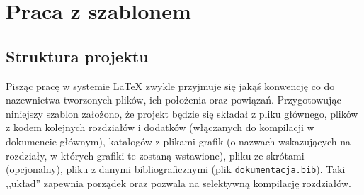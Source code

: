 \chapter{Praca z szablonem}
\section{Struktura projektu}
Pisząc pracę w systemie LaTeX zwykle przyjmuje się jakąś konwencję co do nazewnictwa tworzonych plików, ich położenia oraz powiązań. Przygotowując niniejszy szablon założono, że projekt będzie się składał z pliku głównego, plików z kodem kolejnych rozdziałów i dodatków (włączanych do kompilacji w dokumencie głównym), katalogów z plikami grafik (o nazwach wskazujących na rozdziały, w których grafiki te zostaną wstawione), pliku ze skrótami (opcjonalny), pliku z danymi bibliograficznymi (plik \texttt{dokumentacja.bib}). Taki ,,układ'' zapewnia porządek oraz pozwala na selektywną kompilację rozdziałów. 

